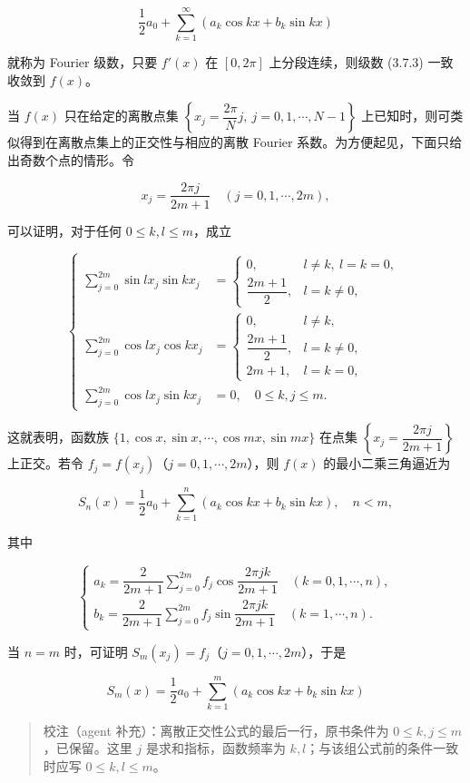\documentclass[
  10pt,
  fontset=fandol]{ctexart}
\begin{document}
\[
\frac12a_0+\sum_{k=1}^{\infty}(a_k\cos kx+b_k\sin kx)\tag{3.7.3}
\]

就称为 Fourier 级数，只要 \(f'(x)\) 在 \([0,2\pi]\) 上分段连续，则级数 (3.7.3) 一致收敛到 \(f(x)\)。

当 \(f(x)\) 只在给定的离散点集 \(\left\{x_j=\dfrac{2\pi}{N}j,\ j=0,1,\cdots,N-1\right\}\) 上已知时，则可类似得到在离散点集上的正交性与相应的离散 Fourier 系数。为方便起见，下面只给出奇数个点的情形。令

\[
x_j=\frac{2\pi j}{2m+1}\quad(j=0,1,\cdots,2m),
\]

可以证明，对于任何 \(0\leqslant k,l\leqslant m\)，成立

\[
\left\{\begin{aligned}
\sum_{j=0}^{2m}\sin lx_j\sin kx_j&=\begin{cases}
0,&l\ne k,\ l=k=0,\\
\dfrac{2m+1}{2},&l=k\ne0,
\end{cases}\\[4pt]
\sum_{j=0}^{2m}\cos lx_j\cos kx_j&=\begin{cases}
0,&l\ne k,\\
\dfrac{2m+1}{2},&l=k\ne0,\\
2m+1,&l=k=0,
\end{cases}\\[4pt]
\sum_{j=0}^{2m}\cos lx_j\sin kx_j&=0,\quad0\leqslant k,j\leqslant m.
\end{aligned}\right.
\]

这就表明，函数族 \(\{1,\allowbreak \cos x,\allowbreak \sin x,\allowbreak \cdots,\allowbreak \cos mx,\allowbreak \sin mx\}\) 在点集 \(\left\{x_j=\dfrac{2\pi j}{2m+1}\right\}\) 上正交。若令 \(f_j=f(x_j)\)（\(j=0,1,\cdots,2m\)），则 \(f(x)\) 的最小二乘三角逼近为

\[
S_n(x)=\frac12a_0+\sum_{k=1}^n(a_k\cos kx+b_k\sin kx),\quad n<m,
\]

其中

\[
\begin{cases}
a_k=\dfrac2{2m+1}\displaystyle\sum_{j=0}^{2m}f_j\cos\dfrac{2\pi jk}{2m+1}\quad(k=0,1,\cdots,n),\\[4pt]
b_k=\dfrac2{2m+1}\displaystyle\sum_{j=0}^{2m}f_j\sin\dfrac{2\pi jk}{2m+1}\quad(k=1,\cdots,n).
\end{cases}\tag{3.7.4}
\]

当 \(n=m\) 时，可证明 \(S_m(x_j)=f_j\)（\(j=0,1,\cdots,2m\)），于是

\[
S_m(x)=\frac12a_0+\sum_{k=1}^m(a_k\cos kx+b_k\sin kx)
\]

\begin{quote}
校注（agent 补充）：离散正交性公式的最后一行，原书条件为 \(0\leqslant k,j\leqslant m\)，已保留。这里 \(j\) 是求和指标，函数频率为 \(k,l\)；与该组公式前的条件一致时应写 \(0\leqslant k,l\leqslant m\)。
\end{quote}
\end{document}
